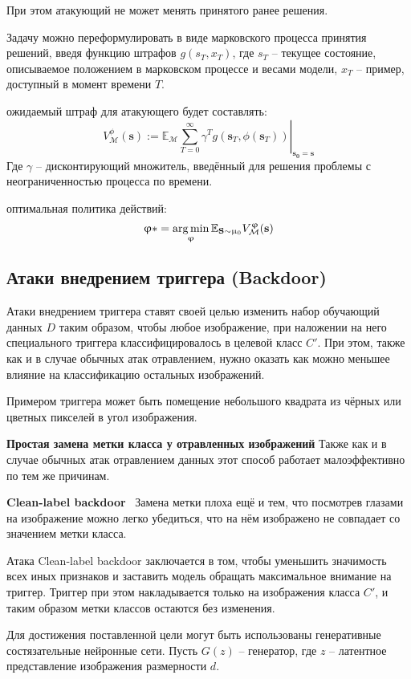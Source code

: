 При этом атакующий не может менять принятого ранее решения.

Задачу можно переформулировать в виде марковского процесса принятия решений, введя функцию штрафов $g(s_T, x_T)$, где $s_T$ – текущее состояние, описываемое положением в марковском процессе и весами модели, $x_T$ – пример, доступный в момент времени $T$.

 ожидаемый штраф для атакующего будет составлять:
$$V_{\mathcal{M}}^{\phi}(\mathbf{s}):=\left.\mathbb{E}_{\mathcal{M}} \sum_{T=0}^{\infty} \gamma^{T} g\left(\mathbf{s}_{T}, \phi\left(\mathbf{s}_{T}\right)\right)\right|_{\mathbf{s_0}=\mathbf{s}}$$
Где $\gamma$ – дисконтирующий множитель, введённый для решения проблемы с неограниченностью процесса по времени.


 оптимальная политика действий:
$$
\upvarphi* = \operatorname*{arg\,min}_{\upvarphi} \mathbb{E}_{\mathbf{S} \sim \upmu_{0}} V_{\mathcal{M}}^{\upvarphi}(\mathbf{s})
$$

\subsection*{Атаки внедрением триггера (Backdoor)}
Атаки внедрением триггера ставят своей целью изменить набор обучающий данных $D$ таким образом, чтобы любое изображение, при наложении на него специального триггера классифицировалось в целевой класс $C'$.
При этом, также как и в случае обычных атак отравлением, нужно оказать как можно меньшее влияние на классификацию остальных изображений.

Примером триггера может быть помещение небольшого квадрата из чёрных или цветных пикселей в угол изображения.

\textbf{Простая замена метки класса у отравленных изображений}
Также как и в случае обычных атак отравлением данных этот способ работает малоэффективно по тем же причинам.

\textbf{Clean-label backdoor}~\cite{zhao_clean-label_2020}
Замена метки плоха ещё и тем, что посмотрев глазами на изображение можно легко убедиться, что на нём изображено не совпадает со значением метки класса.

Атака Clean-label backdoor заключается в том, чтобы уменьшить значимость всех иных признаков и заставить модель обращать максимальное внимание на триггер. Триггер при этом накладывается только на изображения класса $C'$, и таким образом метки классов остаются без изменения.

Для достижения поставленной цели могут быть использованы генеративные состязательные нейронные сети.
Пусть $G(z)$ – генератор, где $z$ – латентное представление изображения размерности $d$.

